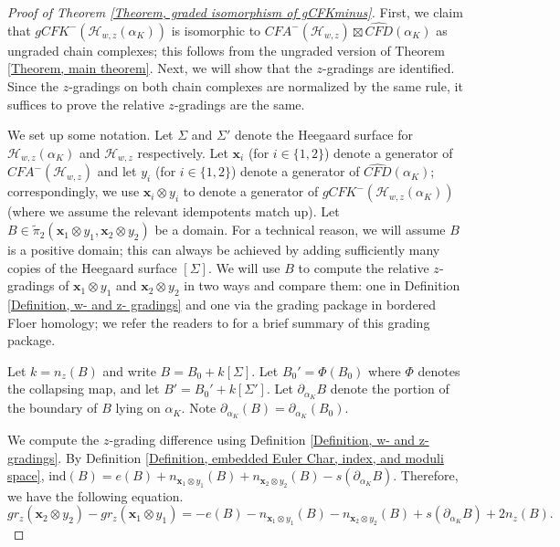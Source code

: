 \documentclass{amsart}
\theoremstyle{definition}
\theoremstyle{remark}
\numberwithin{equation}{section}
\numberwithin{equation}{section} \makeatletter
\begin{document}
\begin{proof}[Proof of Theorem \ref{Theorem, graded isomorphism of gCFKminus}]


First, we claim that $gCFK^-(\mathcal{H}_{w,z}(\alpha_{K}))$ is isomorphic to ${CFA}^-(\mathcal{H}_{w,z})\boxtimes \widehat{CFD}(\alpha_K)$ as ungraded chain complexes; this follows from the ungraded version of Theorem \ref{Theorem, main theorem}. Next, we will show that the $z$-gradings are identified. Since the $z$-gradings on both chain complexes are normalized by the same rule, it suffices to prove the relative $z$-gradings are the same. 

We set up some notation. Let $\Sigma$ and $\Sigma'$ denote the Heegaard surface for $\mathcal{H}_{w,z}(\alpha_{K})$ and $\mathcal{H}_{w,z}$ respectively. Let $\bm{x}_i$ (for $i\in \{1,2\}$) denote a generator of $CFA^-(\mathcal{H}_{w,z})$ and let $y_i$ (for $i\in \{1,2\}$) denote a generator of $\widehat{CFD}(\alpha_K)$; correspondingly, we use $\bm{x}_i\otimes y_i$ to denote a generator of $gCFK^-(\mathcal{H}_{w,z}(\alpha_{K}))$ (where we assume the relevant idempotents match up). Let $B\in \tilde{\pi}_2(\bm{x}_1\otimes y_1,\bm{x}_2\otimes y_2)$ be a domain. For a technical reason, we will assume $B$ is a positive domain; this can always be achieved by adding sufficiently many copies of the Heegaard surface $[\Sigma]$. We will use $B$ to compute the relative $z$-gradings of  $\bm{x}_1\otimes y_1$ and $\bm{x}_2\otimes y_2$ in two ways and compare them: one in Definition \ref{Definition, w- and z- gradings} and one via the grading package in bordered Floer homology; we refer the readers to \cite[Section 2]{Chen2019} for a brief summary of this grading package.

Let $k=n_z(B)$ and write $B=B_0+k[\Sigma]$. Let $B_0'=\Phi(B_0)$ where $\Phi$ denotes the collapsing map, and let $B'=B_0'+k[\Sigma']$. Let $\partial_{\alpha_K} B$ denote the portion of the boundary of $B$ lying on $\alpha_K$. Note $\partial_{\alpha_{K}}(B)=\partial_{\alpha_K}(B_0)$.

We compute the $z$-grading difference using Definition \ref{Definition, w- and z- gradings}.
By Definition \ref{Definition, embedded Euler Char, index, and moduli space}, $\text{ind}(B)=e(B)+n_{\bm{x}_1\otimes y_1}(B)+n_{\bm{x}_2\otimes y_2}(B)-s(\partial_{\alpha_{K}}B)$. Therefore, we have the following equation. 
\begin{equation}\label{Equation, grading difference via domains}
	gr_z(\bm{x}_2\otimes y_2)-gr_z(\bm{x}_1\otimes y_1)=-e(B)-n_{\bm{x}_1\otimes y_1}(B)-n_{\bm{x}_2\otimes y_2}(B)+s(\partial_{\alpha_{K}}B)+2n_z(B).
\end{equation}


\end{proof}
\end{document}
